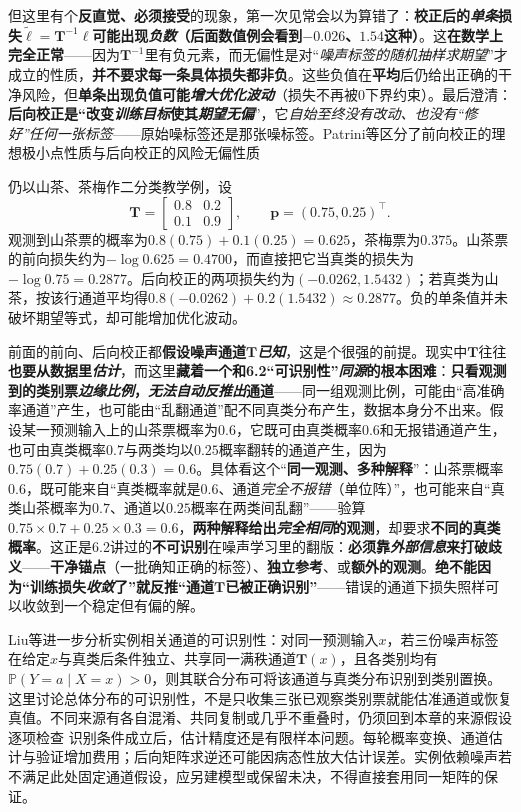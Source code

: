 但这里有个\textbf{反直觉、必须接受}的现象，第一次见常会以为算错了：\textbf{校正后的\emph{单条}损失$\widetilde{\bm{\ell}}=\bm{T}^{-1}\bm\ell$\textbf{可能出现\emph{负数}}（后面数值例会看到$-0.026$、$1.54$这种）}。这\textbf{在数学上完全正常}——因为$\bm{T}^{-1}$里有负元素，而无偏性是对“\emph{噪声标签的\emph{随机抽样}求期望}”才成立的性质，\textbf{并不要求每一条具体损失都非负}。这些负值在\textbf{平均}后仍给出正确的干净风险，但\textbf{单条出现负值可能\emph{增大优化波动}}（损失不再被0下界约束）。最后澄清：\textbf{后向校正是“改变\emph{训练目标}使其\emph{期望无偏}}”，它\emph{自始至终\emph{没有改动、也没有“修好”任何一张标签}}——原始噪标签还是那张噪标签。Patrini等区分了前向校正的理想极小点性质与后向校正的风险无偏性质

仍以山茶、茶梅作二分类教学例，设
\[
  \bm T=\begin{bmatrix}0.8&0.2\\0.1&0.9\end{bmatrix},
  \qquad
  \bm p=(0.75,0.25)^{\top}.
\]
观测到山茶票的概率为$0.8(0.75)+0.1(0.25)=0.625$，茶梅票为$0.375$。山茶票的前向损失约为$-\log0.625=0.4700$，而直接把它当真类的损失为$-\log0.75=0.2877$。后向校正的两项损失约为$(-0.0262,1.5432)$；若真类为山茶，按该行通道平均得$0.8(-0.0262)+0.2(1.5432)\approx0.2877$。负的单条值并未破坏期望等式，却可能增加优化波动。

前面的前向、后向校正都\textbf{假设噪声通道$\bm{T}$\emph{已知}}，这是个很强的前提。现实中$\bm{T}$往往\textbf{也要从数据里\emph{估计}}，而这里\textbf{藏着一个和6.2“可识别性”\emph{同源}的根本困难}：\textbf{只看观测到的类别票\emph{边缘比例}，\emph{无法自动反推出}通道}——同一组观测比例，可能由“高准确率通道”产生，也可能由“乱翻通道”配不同真类分布产生，数据本身分不出来。假设某一预测输入上的山茶票概率为$0.6$，它既可由真类概率$0.6$和无报错通道产生，也可由真类概率$0.7$与两类均以$0.25$概率翻转的通道产生，因为$0.75(0.7)+0.25(0.3)=0.6$。具体看这个“\textbf{同一观测、多种解释}”：山茶票概率$0.6$，既可能来自“真类概率就是$0.6$、通道\emph{完全不报错}（单位阵）”，也可能来自“真类山茶概率为$0.7$、通道以$0.25$概率在两类间乱翻”——验算$0.75\times0.7+0.25\times0.3=0.6$，\textbf{两种解释给出\emph{完全相同}的观测}，却要求\textbf{不同的真类概率}。这正是6.2讲过的\textbf{不可识别}在噪声学习里的翻版：\textbf{必须靠\emph{外部信息}来打破歧义}——\textbf{干净锚点}（一批确知正确的标签）、\textbf{独立参考}、或\textbf{额外的观测}。\textbf{绝不能因为“训练损失\emph{收敛}了”就反推“通道$\bm{T}$已被正确识别”}——错误的通道下损失照样可以收敛到一个稳定但有偏的解。

Liu等进一步分析实例相关通道的可识别性：对同一预测输入$x$，若三份噪声标签在给定$x$与真类后条件独立、共享同一满秩通道$\bm T(x)$，且各类别均有$\mathbb P(Y=a\mid X=x)>0$，则其联合分布可将该通道与真类分布识别到类别置换。这里讨论总体分布的可识别性，不是只收集三张已观察类别票就能估准通道或恢复真值。不同来源有各自混淆、共同复制或几乎不重叠时，仍须回到本章的来源假设逐项检查 识别条件成立后，估计精度还是有限样本问题。每轮概率变换、通道估计与验证增加费用；后向矩阵求逆还可能因病态性放大估计误差。实例依赖噪声若不满足此处固定通道假设，应另建模型或保留未决，不得直接套用同一矩阵的保证。

